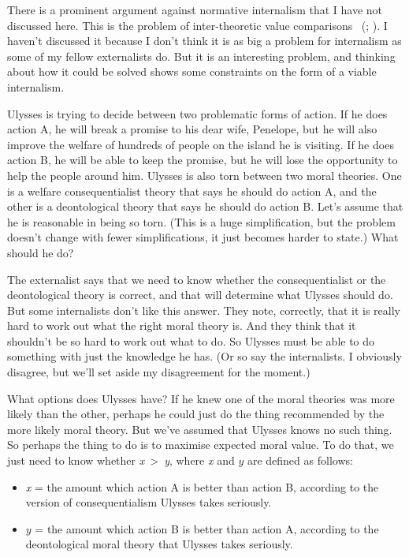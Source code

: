 \documentclass[
  10pt,
  letterpaper,
  twoside]{scrbook}
\begin{document}
There is a prominent argument against normative internalism that I have
not discussed here. This is the problem of inter-theoretic value
comparisons ~(;
). I haven't discussed it because
I don't think it is as big a problem for internalism as some of my
fellow externalists do. But it is an interesting problem, and thinking
about how it could be solved shows some constraints on the form of a
viable internalism.

{Ulysses} is trying to decide between two problematic forms of action.
If he does action A, he will break a promise to his dear wife,
{Penelope}, but he will also improve the welfare of hundreds of people
on the island he is visiting. If he does action B, he will be able to
keep the promise, but he will lose the opportunity to help the people
around him. {Ulysses} is also torn between two moral theories. One is a
welfare consequentialist theory that says he should do action A, and the
other is a deontological theory that says he should do action B. Let's
assume that he is reasonable in being so torn. (This is a huge
simplification, but the problem doesn't change with fewer
simplifications, it just becomes harder to state.) What should he do?

The externalist says that we need to know whether the consequentialist
or the deontological theory is correct, and that will determine what
{Ulysses} should do. But some internalists don't like this answer. They
note, correctly, that it is really hard to work out what the right moral
theory is. And they think that it shouldn't be so hard to work out what
to do. So {Ulysses} must be able to do something with just the knowledge
he has. (Or so say the internalists. I obviously disagree, but we'll set
aside my disagreement for the moment.)

What options does {Ulysses} have? If he knew one of the moral theories
was more likely than the other, perhaps he could just do the thing
recommended by the more likely moral theory. But we've assumed that
{Ulysses} knows no such thing. So perhaps the thing to do is to maximise
expected moral value. To do that, we just need to know whether
\emph{x}~\textgreater~\emph{y}, where \emph{x} and \(y\) are defined as
follows:

\begin{itemize}
\item
  \emph{x} = the amount which action A is better than action B,
  according to the version of consequentialism {Ulysses} takes
  seriously.
\item
  \(y\) = the amount which action B is better than action A, according
  to the deontological moral theory that {Ulysses} takes seriously.
\end{itemize}
\end{document}
